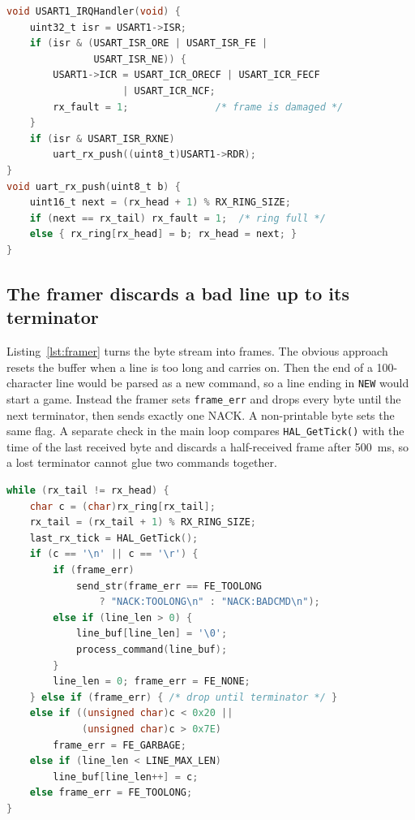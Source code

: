 \begin{lstlisting}[float=tp, language=C, caption={Interrupt handler and ring buffer (\texttt{stm32f0xx\_it.c}, \texttt{main.c}).}, label=lst:isr]
void USART1_IRQHandler(void) {
    uint32_t isr = USART1->ISR;
    if (isr & (USART_ISR_ORE | USART_ISR_FE |
               USART_ISR_NE)) {
        USART1->ICR = USART_ICR_ORECF | USART_ICR_FECF
                    | USART_ICR_NCF;
        rx_fault = 1;               /* frame is damaged */
    }
    if (isr & USART_ISR_RXNE)
        uart_rx_push((uint8_t)USART1->RDR);
}
void uart_rx_push(uint8_t b) {
    uint16_t next = (rx_head + 1) % RX_RING_SIZE;
    if (next == rx_tail) rx_fault = 1;  /* ring full */
    else { rx_ring[rx_head] = b; rx_head = next; }
}
\end{lstlisting}

\subsection{The framer discards a bad line up to its terminator}
Listing~\ref{lst:framer} turns the byte stream into frames. The obvious
approach resets the buffer when a line is too long and carries on. Then the end
of a 100-character line would be parsed as a new command, so a line ending in
\texttt{NEW} would start a game. Instead the framer sets \texttt{frame\_err}
and drops every byte until the next terminator, then sends exactly one NACK.
A non-printable byte sets the same flag. A separate check in the main loop
compares \texttt{HAL\_GetTick()} with the time of the last received byte and
discards a half-received frame after 500~ms, so a lost terminator cannot glue
two commands together.

\begin{lstlisting}[float=tp, language=C, caption={Frame assembler (\texttt{main.c}).}, label=lst:framer]
while (rx_tail != rx_head) {
    char c = (char)rx_ring[rx_tail];
    rx_tail = (rx_tail + 1) % RX_RING_SIZE;
    last_rx_tick = HAL_GetTick();
    if (c == '\n' || c == '\r') {
        if (frame_err)
            send_str(frame_err == FE_TOOLONG
                ? "NACK:TOOLONG\n" : "NACK:BADCMD\n");
        else if (line_len > 0) {
            line_buf[line_len] = '\0';
            process_command(line_buf);
        }
        line_len = 0; frame_err = FE_NONE;
    } else if (frame_err) { /* drop until terminator */ }
    else if ((unsigned char)c < 0x20 ||
             (unsigned char)c > 0x7E)
        frame_err = FE_GARBAGE;
    else if (line_len < LINE_MAX_LEN)
        line_buf[line_len++] = c;
    else frame_err = FE_TOOLONG;
}
\end{lstlisting}

